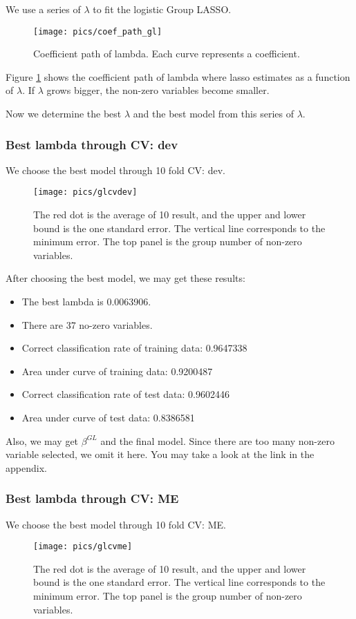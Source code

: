 \documentclass[]{article}
\begin{document}
We use a series of $\lambda$ to fit the logistic Group LASSO.
\begin{figure}[H]
	\centering
	\texttt{[image: pics/coef\_path\_gl]}
	\caption{Coefficient path of lambda. Each curve represents a coefficient.\label{fig=cpgl}}
\end{figure}
Figure \ref{fig=cpgl} shows the coefficient path of lambda where lasso estimates as a function of $ \lambda $. If $ \lambda $ grows bigger, the non-zero variables become smaller. 

Now we determine the best $ \lambda $ and the best model from this series of $ \lambda $.

\subsubsection{Best lambda through CV: dev}
We choose the best model through 10 fold CV: dev.
\begin{figure}[H]
	\centering
	\texttt{[image: pics/glcvdev]}
	\caption{The red dot is the average of 10 result, and the upper and lower bound is the one standard error. The vertical line corresponds to the minimum error. The top panel is the group number of non-zero variables.\label{fig=glcvdev}}
\end{figure}

After choosing the best model, we may get these results:
\begin{itemize}
	\item The best lambda is 0.0063906.
	\item There are 37 no-zero variables.
	\item Correct classification rate of training data: 0.9647338
	\item Area under curve of training data: 0.9200487
	\item Correct classification rate of test data: 0.9602446
	\item Area under curve of test data: 0.8386581
\end{itemize}

Also, we may get $ \beta^{GL} $ and the final model. Since there are too many non-zero variable selected, we omit it here. You may take a look at the link in the appendix.

\subsubsection{Best lambda through CV: ME}
We choose the best model through 10 fold CV: ME.
\begin{figure}[H]
	\centering
	\texttt{[image: pics/glcvme]}
	\caption{The red dot is the average of 10 result, and the upper and lower bound is the one standard error. The vertical line corresponds to the minimum error. The top panel is the group number of non-zero variables.\label{fig=glcvme}}
\end{figure}
\end{document}
